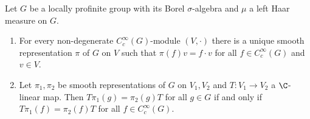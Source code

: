 Let $G$ be a locally profinite group with its Borel $\sigma$-algebra and $\mu$ a left Haar measure on $G$.
\begin{enumerate}[label=(\alph*)]
\item For every non-degenerate $C_c^\infty(G)$-module $(V,\cdot)$ there is a unique smooth representation $\pi$ of $G$
  on $V$ such that $\pi(f)v=f\cdot v$ for all $f\in C_c^\infty(G)$ and $v\in V$.
\item Let $\pi_1,\pi_2$ be smooth representations of $G$ on $V_1,V_2$ and $T\colon V_1\to V_2$ a $\C$-linear map. Then
  $T\pi_1(g)=\pi_2(g)T$ for all $g\in G$ if and only if $T\pi_1(f)=\pi_2(f)T$ for all $f\in C_c^\infty(G)$.
\end{enumerate}
